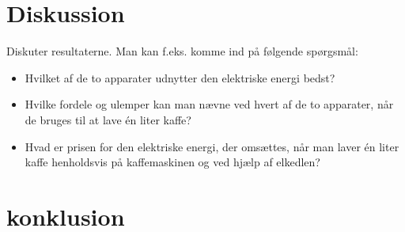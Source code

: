 \section{Diskussion}
Diskuter resultaterne. Man kan f.eks. komme ind på følgende spørgsmål:
\begin{itemize}
	\item Hvilket af de to apparater udnytter den elektriske energi bedst?
	\item Hvilke fordele og ulemper kan man nævne ved hvert af de to apparater, når de bruges til at lave \'en liter kaffe?
	\item Hvad er prisen for den elektriske energi, der omsættes, når man laver én liter kaffe henholdsvis på kaffemaskinen og ved hjælp af elkedlen?
\end{itemize}

 \section{konklusion}

